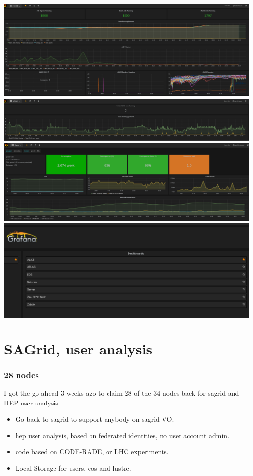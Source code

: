 \documentclass{beamer}
\begin{document}
\begin{frame}
  \includegraphics[scale=0.25]{ALICEProcessing-Grafana.pdf}\\
  \includegraphics[scale=0.25]{ATLASProcessing-Grafana.pdf}\\
  \includegraphics[scale=0.25]{Server50-Grafana.pdf}\\
  \includegraphics[scale=0.25]{GrafanaMenu.pdf}
\end{frame}


\section{SAGrid, user analysis}
\begin{frame}
\frametitle{28 nodes}
I got the go ahead 3 weeks ago to claim 28 of the 34 nodes back for sagrid and HEP user analysis.
\begin{itemize}
  \item Go back to sagrid to support anybody on sagrid VO.
  \item hep user analysis, based on federated identities, no user account admin.
  \item code based on CODE-RADE, or LHC experiments.
  \item Local Storage for users, eos and lustre.
\end{itemize}
\end{frame}
\end{document}
